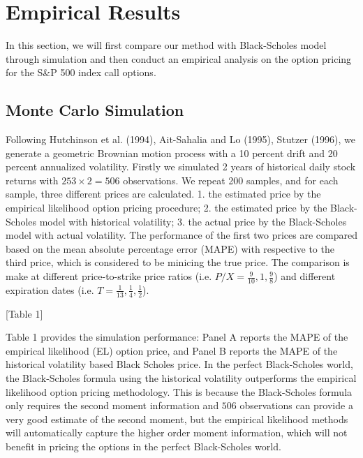 \documentclass[oneside,english]{amsbook}
\numberwithin{section}{chapter}
\numberwithin{equation}{section}
\numberwithin{figure}{section}
\theoremstyle{plain}
\theoremstyle{plain}
\theoremstyle{definition}
\theoremstyle{plain}
\theoremstyle{plain}
\theoremstyle{remark}
\theoremstyle{definition}
\theoremstyle{definition}
\begin{document}
\section{Empirical Results}
In this section,  we will first compare our method with Black-Scholes model through simulation and then conduct an empirical analysis on the option pricing for the S\&P 500 index call options.  

\subsection{Monte Carlo Simulation}

Following Hutchinson et al. (1994), Ait-Sahalia and Lo (1995), Stutzer (1996), we generate a geometric Brownian motion process with a 10 percent drift and 20 percent annualized volatility. Firstly we simulated 2 years of historical daily stock returns with $253\times 2=506$ observations. We repeat 200 samples, and for each sample, three different prices are calculated. 1. the estimated price by the empirical likelihood option pricing procedure; 2. the estimated price by the Black-Scholes model with historical volatility; 3. the actual price by the Black-Scholes model with actual volatility. The performance of the first two prices are compared based on the mean absolute percentage error (MAPE) with respective to the third price, which is considered to be minicing the true price. The comparison is make at different price-to-strike price ratios (i.e. $P/X=\frac{9}{10}, 1, \frac{9}{8}$) and different expiration dates (i.e. $T=\frac{1}{13}, \frac{1}{4}, \frac{1}{2}$). 


\begin{center}
[Table 1]
\end{center}

Table 1 provides the simulation performance: Panel A reports the MAPE of the empirical likelihood (EL) option price, and Panel B reports the MAPE of the historical volatility based Black Scholes price. In the perfect Black-Scholes world, the Black-Scholes formula using the historical volatility outperforms the empirical likelihood option pricing methodology. This is because the Black-Scholes formula only requires the second moment information and $506$ observations can provide a very good estimate of the second moment, but the empirical likelihood methods will automatically capture the higher order moment information, which will not benefit in pricing the options in the perfect Black-Scholes world.  
\end{document}
